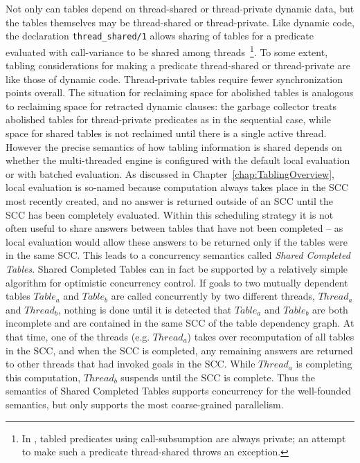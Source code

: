 Not only can tables depend on thread-shared or thread-private dynamic
data, but 
the tables themselves may be thread-shared or thread-private.  Like
dynamic code, the declaration {\tt thread\_shared/1} allows sharing of
tables for a predicate evaluated with call-variance to be shared among
threads~\footnote{In \version, tabled predicates using
  call-subsumption are always private; an attempt to make such a
  predicate thread-shared throws an exception.}.
%
To some extent, tabling considerations for making a predicate
thread-shared or thread-private are like those of dynamic code.
Thread-private tables require fewer synchronization points overall.
The situation for reclaiming space for abolished tables is analogous
to reclaiming space for retracted dynamic clauses: the garbage
collector treats abolished tables for thread-private predicates as in
the sequential case, while space for shared tables is not reclaimed
until there is a single active thread.  However the precise semantics
of how tabling information is shared depends on whether the
multi-threaded engine is configured with the default local evaluation
or with batched evaluation.  As discussed in
Chapter~\ref{chap:TablingOverview}, local evaluation is so-named
because computation always takes place in the SCC most recently
created, and no answer is returned outside of an SCC until the SCC has
been completely evaluated.  Within this scheduling strategy it is not
often useful to share answers between tables that have not been
completed -- as local evaluation would allow these answers to be
returned only if the tables were in the same SCC.  This leads to a
concurrency semantics called {\em Shared Completed Tables}.  Shared
Completed Tables can in fact be supported by a relatively simple
algorithm for optimistic concurrency control.  If goals to two
mutually dependent tables $Table_a$ and $Table_b$ are called
concurrently by two different threads, $Thread_a$ and $Thread_b$,
nothing is done until it is detected that $Table_a$ and $Table_b$ are
both incomplete and are contained in the same SCC of the table
dependency graph.  At that time, one of the threads (e.g. $Thread_a$)
takes over recomputation of all tables in the SCC, and when the SCC is
completed, any remaining answers are returned to other threads that
had invoked goals in the SCC.  While $Thread_a$ is completing this
computation, $Thread_b$ suspends until the SCC is complete.  Thus the
semantics of Shared Completed Tables supports concurrency for the
well-founded semantics, but only supports the most coarse-grained
parallelism.

